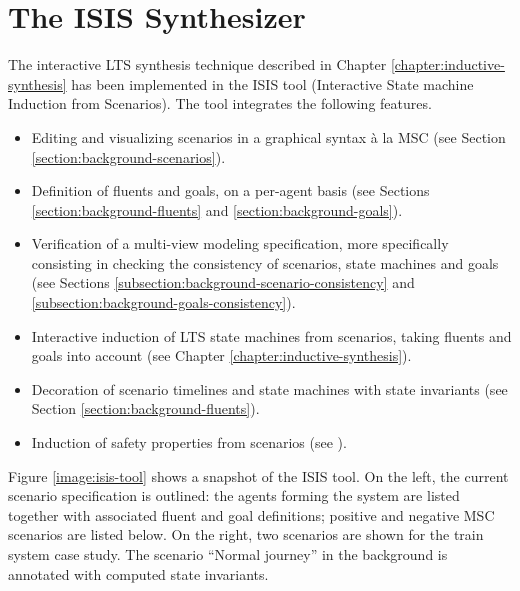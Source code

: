 \section{The ISIS Synthesizer\label{section:tool-support-isis}}

The interactive LTS synthesis technique described in Chapter \ref{chapter:inductive-synthesis} has been implemented in the ISIS tool (Interactive State machine Induction from Scenarios). The tool integrates the following features.

\begin{itemize}
\item Editing and visualizing scenarios in a graphical syntax \`a la MSC (see Section \ref{section:background-scenarios}).
\item Definition of fluents and goals, on a per-agent basis (see Sections \ref{section:background-fluents} and \ref{section:background-goals}).
\item Verification of a multi-view modeling specification, more specifically consisting in checking the consistency of scenarios, state machines and goals (see Sections \ref{subsection:background-scenario-consistency} and \ref{subsection:background-goals-consistency}).
\item Interactive induction of LTS state machines from scenarios, taking fluents and goals into account (see Chapter \ref{chapter:inductive-synthesis}).
\item Decoration of scenario timelines and state machines with state invariants (see Section \ref{section:background-fluents}).
\item Induction of safety properties from scenarios (see \cite{Damas:2011}).
\end{itemize}

Figure \ref{image:isis-tool} shows a snapshot of the ISIS tool. On the left, the current scenario specification is outlined: the agents forming the system are listed together with associated fluent and goal definitions; positive and negative MSC scenarios are listed below. On the right, two scenarios are shown for the train system case study. The scenario ``Normal journey'' in the background is annotated with computed state invariants.


